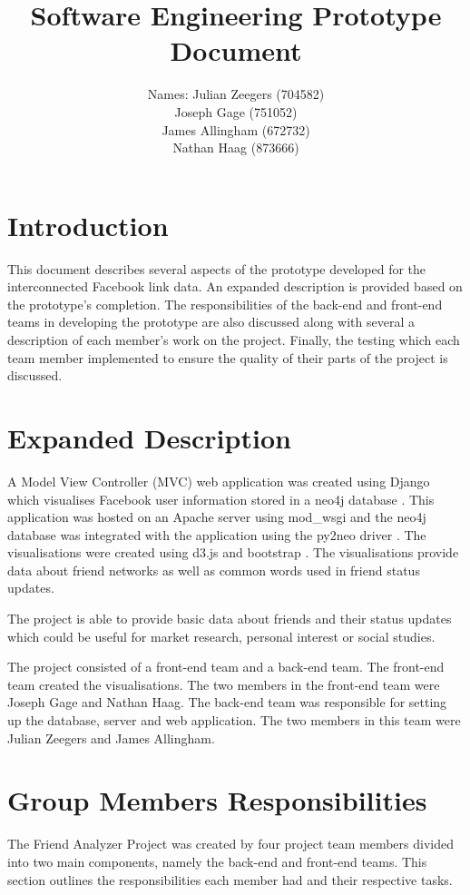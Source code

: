 \documentclass[10pt,onecolumn]{article}
\title{\vspace{-4.2cm}Software Engineering Prototype Document }
\author{ Names: Julian Zeegers (704582) \\  Joseph Gage (751052)\\James Allingham (672732) \\ Nathan Haag (873666) }
\begin{document}
\maketitle
\pagestyle{plain}
\setcounter{page}{1}


\section{Introduction}
This document describes several aspects of the prototype developed for the interconnected Facebook link data. An expanded description is provided based on the prototype's completion. The responsibilities of the back-end and front-end teams in developing the prototype are also discussed along with several a description of each member's work on the project. Finally, the testing which each team member implemented to ensure the quality of their parts of the project is discussed.

\section{Expanded Description}
A Model View Controller (MVC) web application was created using Django \cite{django} which visualises Facebook user information stored in a neo4j database \cite{neo4j}. This application was hosted on an Apache server using mod\_wsgi \cite{wsgi} and the neo4j database was integrated with the application using the py2neo driver \cite{py2neo}. The visualisations were created using d3.js \cite{d3js} and bootstrap \cite{bootstrap}. The visualisations provide data about friend networks as well as common words used in friend status updates.

The project is able to provide basic data about friends and their status updates which could be useful for market research, personal interest or social studies.

The project consisted of a front-end team and a back-end team. The front-end team created the visualisations. The two members in the front-end team were Joseph Gage and Nathan Haag. The back-end team was responsible for setting up the database, server and web application. The two members in this team were Julian Zeegers and James Allingham.

\section{Group Members Responsibilities}
The Friend Analyzer Project was created by four project team members divided into two main components, namely the back-end and front-end teams. This section outlines the responsibilities each member had and their respective tasks. 
\end{document}
